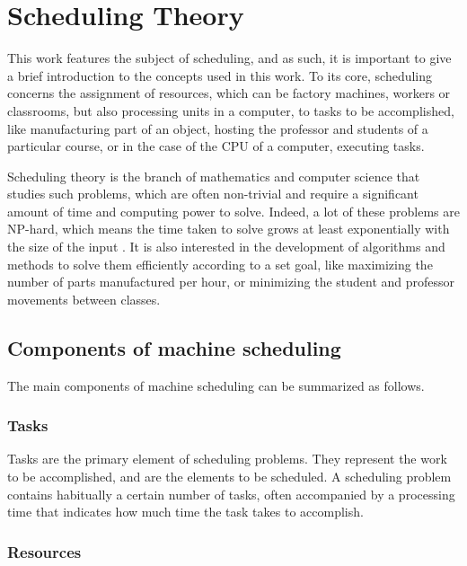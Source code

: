 \documentclass{mimosis}
\begin{document}
\section{Scheduling Theory}

This work features the subject of scheduling, and as such, it is important to give a brief introduction to the concepts used in this work. To its core, scheduling concerns the assignment of resources, which can be factory machines, workers or classrooms, but also processing units in a computer, to tasks to be accomplished, like manufacturing part of an object, hosting the professor and students of a particular course, or in the case of the CPU of a computer, executing tasks.

Scheduling theory is the branch of mathematics and computer science that studies such problems, which are often non-trivial and require a significant amount of time and computing power to solve. Indeed, a lot of these problems are NP-hard, which means the time taken to solve grows at least exponentially with the size of the input \citep{garey1979computers}. It is also interested in the development of algorithms and methods to solve them efficiently according to a set goal, like maximizing the number of parts manufactured per hour, or minimizing the student and professor movements between classes.

\subsection{Components of machine scheduling}


The main components of machine scheduling can be summarized as follows.

\subsubsection{Tasks}

Tasks are the primary element of scheduling problems. They represent the work to be accomplished, and are the elements to be scheduled. A scheduling problem contains habitually a certain number of tasks, often accompanied by a processing time that indicates how much time the task takes to accomplish.

\subsubsection{Resources}
\end{document}
